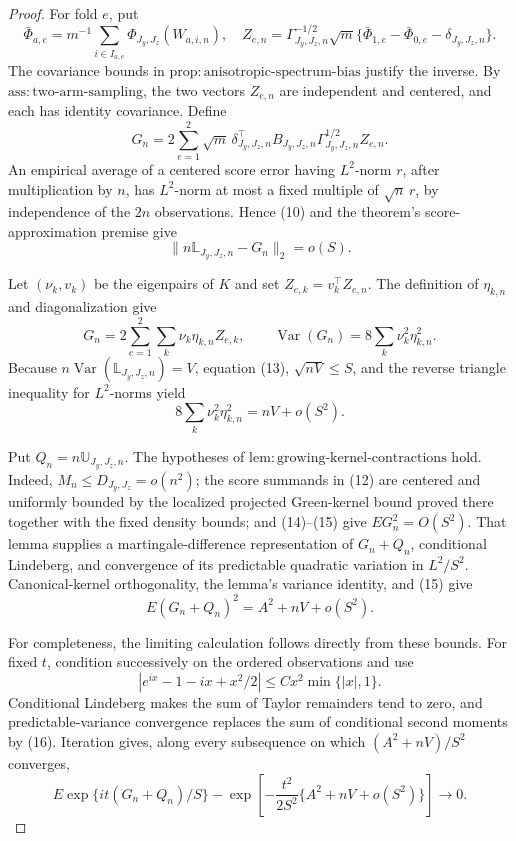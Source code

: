 \documentclass{article}
\begin{document}
\begin{proof}
For fold \(e\), put
\[
\bar\Phi_{a,e}=m^{-1}\sum_{i\in I_{a,e}}\Phi_{J_y,J_z}(W_{a,i,n}),
\quad
Z_{e,n}=\Gamma_{J_y,J_z,n}^{-1/2}\sqrt m
\{\bar\Phi_{1,e}-\bar\Phi_{0,e}-\delta_{J_y,J_z,n}\}. \tag{11}
\]
The covariance bounds in \(\mathrm{prop{:}anisotropic\text{-}spectrum\text{-}bias}\) justify the inverse. By \(\mathrm{ass{:}two\text{-}arm\text{-}sampling}\), the two vectors \(Z_{e,n}\) are independent and centered, and each has identity covariance. Define
\[
G_n=2\sum_{e=1}^2\sqrt m\,
\delta_{J_y,J_z,n}^{\top}B_{J_y,J_z,n}
\Gamma_{J_y,J_z,n}^{1/2}Z_{e,n}. \tag{12}
\]
An empirical average of a centered score error having \(L^2\)-norm \(r\), after multiplication by \(n\), has \(L^2\)-norm at most a fixed multiple of \(\sqrt n\,r\), by independence of the \(2n\) observations. Hence (10) and the theorem's score-approximation premise give
\[
\|n\mathbb L_{J_y,J_z,n}-G_n\|_2=o(S). \tag{13}
\]

Let \((\nu_k,v_k)\) be the eigenpairs of \(K\) and set \(Z_{e,k}=v_k^{\top}Z_{e,n}\). The definition of \(\eta_{k,n}\) and diagonalization give
\[
G_n=2\sum_{e=1}^2\sum_k\nu_k\eta_{k,n}Z_{e,k},
\qquad
\operatorname{Var}(G_n)=8\sum_k\nu_k^2\eta_{k,n}^2. \tag{14}
\]
Because \(n\operatorname{Var}(\mathbb L_{J_y,J_z,n})=V\), equation (13), \(\sqrt{nV}\le S\), and the reverse triangle inequality for \(L^2\)-norms yield
\[
8\sum_k\nu_k^2\eta_{k,n}^2=nV+o(S^2). \tag{15}
\]

Put \(Q_n=n\mathbb U_{J_y,J_z,n}\). The hypotheses of \(\mathrm{lem{:}growing\text{-}kernel\text{-}contractions}\) hold. Indeed, \(M_n\le D_{J_y,J_z}=o(n^2)\); the score summands in (12) are centered and uniformly bounded by the localized projected Green-kernel bound proved there together with the fixed density bounds; and (14)--(15) give \(EG_n^2=O(S^2)\). That lemma supplies a martingale-difference representation of \(G_n+Q_n\), conditional Lindeberg, and convergence of its predictable quadratic variation in \(L^2/S^2\). Canonical-kernel orthogonality, the lemma's variance identity, and (15) give
\[
E(G_n+Q_n)^2=A^2+nV+o(S^2). \tag{16}
\]

For completeness, the limiting calculation follows directly from these bounds. For fixed \(t\), condition successively on the ordered observations and use
\[
|e^{ix}-1-ix+x^2/2|\le Cx^2\min\{|x|,1\}.
\]
Conditional Lindeberg makes the sum of Taylor remainders tend to zero, and predictable-variance convergence replaces the sum of conditional second moments by (16). Iteration gives, along every subsequence on which \((A^2+nV)/S^2\) converges,
\[
E\exp\{it(G_n+Q_n)/S\}
-\exp\!\left[-\frac{t^2}{2S^2}\{A^2+nV+o(S^2)\}\right]\longrightarrow0. \tag{17}
\]


\end{proof}
\end{document}
